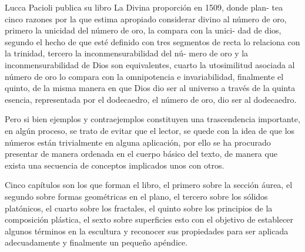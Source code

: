 \documentclass[a4paper]{book}
\begin{document}
  Lucca Pacioli publica su libro La Divina proporción en 1509, donde plan-
  tea cinco razones por la que estima apropiado considerar divino al número
  de oro, primero la unicidad del número de oro, la compara con la unici-
  dad de dios, segundo el hecho de que esté definido con tres segmentos de
  recta lo relaciona con la trinidad, tercero la inconmensurabilidad del nú-
  mero de oro y la inconmensurabilidad de Dios son equivalentes, cuarto la
  utosimilitud asociada al número de oro lo compara con la omnipotencia e
  invariabilidad, finalmente el quinto, de la misma manera en que Dios dio ser
  al universo a través de la quinta esencia, representada por el dodecaedro,
  el número de oro, dio ser al dodecaedro.

  Pero si bien ejemplos y contraejemplos constituyen una trascendencia
  importante, en algún proceso, se trato de evitar que el lector, se quede con
  la idea de que los números están trivialmente en alguna aplicación, por
  ello se ha procurado presentar de manera ordenada en el cuerpo básico del
  texto, de manera que exista una secuencia de conceptos implicados unos
  con otros.

  Cinco capítulos son los que forman el libro, el primero sobre la sección
  áurea, el segundo sobre formas geométricas en el plano, el tercero sobre los
  sólidos platónicos, el cuarto sobre los fractales, el quinto sobre los principios
  de la composición plástica, el sexto sobre superficies esto con el objetivo de
  establecer algunos términos en la escultura y reconocer sus propiedades
  para ser aplicada adecuadamente y finalmente un pequeño apéndice.



  
  
  
  
  
  
  

  
  
  \printindex

  \appendix
  \setcounter{page}{1}
  
\end{document}
